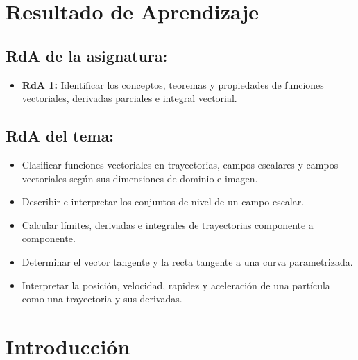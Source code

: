 \documentclass[a4,11pt]{aleph-notas}
\begin{document}
\encabezado

\section*{Resultado de Aprendizaje}

\subsection*{RdA de la asignatura:}
\begin{itemize}[leftmargin=*]
    \item \textbf{RdA 1:} Identificar los conceptos, teoremas y propiedades de funciones vectoriales, derivadas parciales e integral vectorial.
\end{itemize}

\subsection*{RdA del tema:}
\begin{itemize}[leftmargin=*]
    \item Clasificar funciones vectoriales en trayectorias, campos escalares y campos vectoriales según sus dimensiones de dominio e imagen.
    \item Describir e interpretar los conjuntos de nivel de un campo escalar.
    \item Calcular límites, derivadas e integrales de trayectorias componente a componente.
    \item Determinar el vector tangente y la recta tangente a una curva parametrizada.
    \item Interpretar la posición, velocidad, rapidez y aceleración de una partícula como una trayectoria y sus derivadas.
\end{itemize}

\section*{Introducción}
\end{document}
